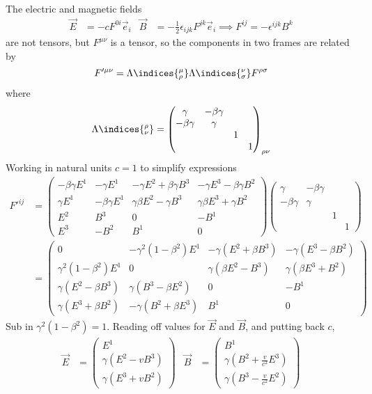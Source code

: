 \documentclass[12pt]{article}
\begin{document}
        \subsubsection{} The electric and magnetic fields \begin{align*}
            \vec E &= - cF^{0i} \vec e_i& \vec B &= -\frac{1}{2} \epsilon_{ijk} F^{jk}\vec e_i\implies F^{ij} = -\epsilon^{ijk} B^k
        \end{align*}
        are not tensors, but \(F^{\mu\nu}\) is a tensor, so the components in two frames are related by \[
            F'^{\mu\nu} = \Lambda\indices{^\mu_\rho} \Lambda\indices{^\nu_\sigma} F^{\rho\sigma} 
        \]
        where \[
            \Lambda\indices{^\rho_\nu}  = \begin{pmatrix} \gamma & - \beta\gamma\\- \beta\gamma&\gamma\\ &&1\\ &&&1 \end{pmatrix}_{\rho\nu}
        \]
        Working in natural units \(c = 1\) to simplify expressions \begin{align*}
            F'^{ij} &= \begin{pmatrix} - \beta\gamma E^1 & - \gamma E^1 &- \gamma E^2 + \beta\gamma B^3& - \gamma E^3 - \beta\gamma B^2\\ \gamma E^1& - \beta\gamma E^1& \gamma \beta E^2 - \gamma B^3& \gamma \beta E^3 + \gamma B^2\\ E^2& B^3& 0 & - B^1\\ E^3 & - B^2& B^1&0  \end{pmatrix} \begin{pmatrix} \gamma & - \beta\gamma\\- \beta\gamma&\gamma\\ &&1\\ &&&1 \end{pmatrix}\\
            &= \begin{pmatrix} 0 & - \gamma^2 (1 - \beta^2) E^1 &- \gamma (E^2 + \beta B^3)& - \gamma (E^3 - \beta B^2)\\ \gamma^2(1 - \beta^2) E^1& 0& \gamma (\beta E^2 - B^3)& \gamma (\beta E^3 + B^2)\\ \gamma(E^2 - \beta B^3)& \gamma(B^3 - \beta E^2)& 0 & - B^1\\ \gamma(E^3 + \beta B^2) & - \gamma(B^2 + \beta E^3)& B^1&0  \end{pmatrix}
        \end{align*}
        Sub in \(\gamma^2(1 - \beta^2) = 1\). Reading off values for \(\vec E\) and \(\vec B\), and putting back \(c\), \begin{align*}
            \vec E &= \begin{pmatrix} E^1\\ \gamma(E^2 - v B^3)\\ \gamma(E^3 + vB^2) \end{pmatrix} & \vec B &= \begin{pmatrix} B^1\\ \gamma(B^2 + \frac{v}{c^2} E^3)\\ \gamma(B^3 - \frac{v}{c^2}E^2) \end{pmatrix}
        \end{align*}
\end{document}
